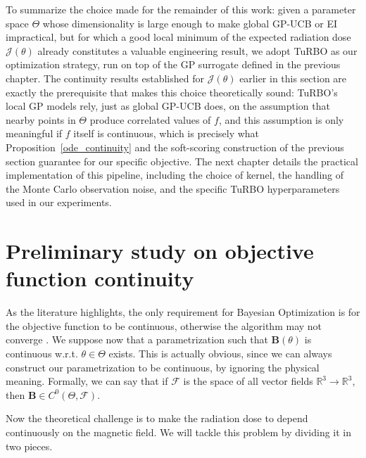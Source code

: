 \documentclass{article}
\begin{document}
	To summarize the choice made for the remainder of this work: given a parameter space $\Theta$ whose dimensionality is large enough to make global GP-UCB or EI impractical, but for which a good local minimum of the expected radiation dose $\mathcal{J}(\theta)$ already constitutes a valuable engineering result, we adopt TuRBO as our optimization strategy, run on top of the GP surrogate defined in the previous chapter. The continuity results established for $\mathcal{J}(\theta)$ earlier in this section are exactly the prerequisite that makes this choice theoretically sound: TuRBO's local GP models rely, just as global GP-UCB does, on the assumption that nearby points in $\Theta$ produce correlated values of $f$, and this assumption is only meaningful if $f$ itself is continuous, which is precisely what Proposition~\ref{ode_continuity} and the soft-scoring construction of the previous section guarantee for our specific objective. The next chapter details the practical implementation of this pipeline, including the choice of kernel, the handling of the Monte Carlo observation noise, and the specific TuRBO hyperparameters used in our experiments.
	
	
	\section{Preliminary study on objective function continuity}
	\label{sec:continuity}
	As the literature highlights, the only requirement for Bayesian Optimization is for the objective function to be continuous, otherwise the algorithm may not converge \cite{frazier2018tutorialbayesianoptimization}. We suppose now that a parametrization such that $\mathbf{B}(\theta)$ is continuous w.r.t. $\theta \in \Theta$ exists. This is actually obvious, since we can always construct our parametrization to be continuous, by ignoring the physical meaning. Formally, we can say that if $\mathcal{F}$ is the space of all vector fields $\mathbb{R}^3 \to \mathbb{R}^3$, then $\mathbf{B} \in C^0(\Theta, \mathcal{F})$.
	
	Now the theoretical challenge is to make the radiation dose to depend continuously on the magnetic field. We will tackle this problem by dividing it in two pieces.
	
\end{document}
